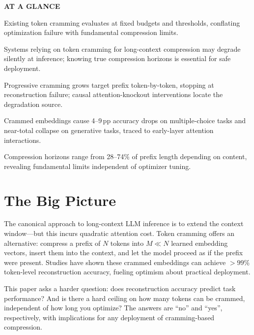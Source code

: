 \documentclass[10pt,twocolumn]{article}
\begin{document}
\begin{mdframed}[backgroundcolor=boxgray,linecolor=rulered,linewidth=1pt,
    innerleftmargin=6pt,innerrightmargin=6pt,
    innertopmargin=6pt,innerbottommargin=6pt]
\textbf{\small AT A GLANCE}\par\vspace{4pt}
\begin{description}[leftmargin=0pt,labelsep=4pt,itemsep=2pt,parsep=0pt,
    font=\small\bfseries]
  \item[Problem:] Existing token cramming evaluates at fixed budgets
    and thresholds, conflating optimization failure with fundamental
    compression limits.
  \item[Why it matters:] Systems relying on token cramming for
    long-context compression may degrade silently at inference;
    knowing true compression horizons is essential for safe deployment.
  \item[Method:] Progressive cramming grows target prefix
    token-by-token, stopping at reconstruction failure; causal
    attention-knockout interventions locate the degradation source.
  \item[Result:] Crammed embeddings cause 4--9\,pp accuracy drops
    on multiple-choice tasks and near-total collapse on generative
    tasks, traced to early-layer attention interactions.
  \item[Evidence:] Compression horizons range from 28--74\% of
    prefix length depending on content, revealing fundamental limits
    independent of optimizer tuning.
\end{description}
\end{mdframed}

\section{The Big Picture}

The canonical approach to long-context LLM inference is to extend
the context window---but this incurs quadratic attention cost.
Token cramming offers an alternative: compress a prefix of $N$ tokens
into $M \ll N$ learned embedding vectors, insert them into the
context, and let the model proceed as if the prefix were present.
Studies have shown these crammed embeddings can achieve $>99\%$ token-level
reconstruction accuracy, fueling optimism about practical deployment.

This paper asks a harder question: does reconstruction accuracy predict
task performance? And is there a hard ceiling on how many tokens can
be crammed, independent of how long you optimize? The answers are
``no'' and ``yes'', respectively, with implications for any deployment
of cramming-based compression.
\end{document}
